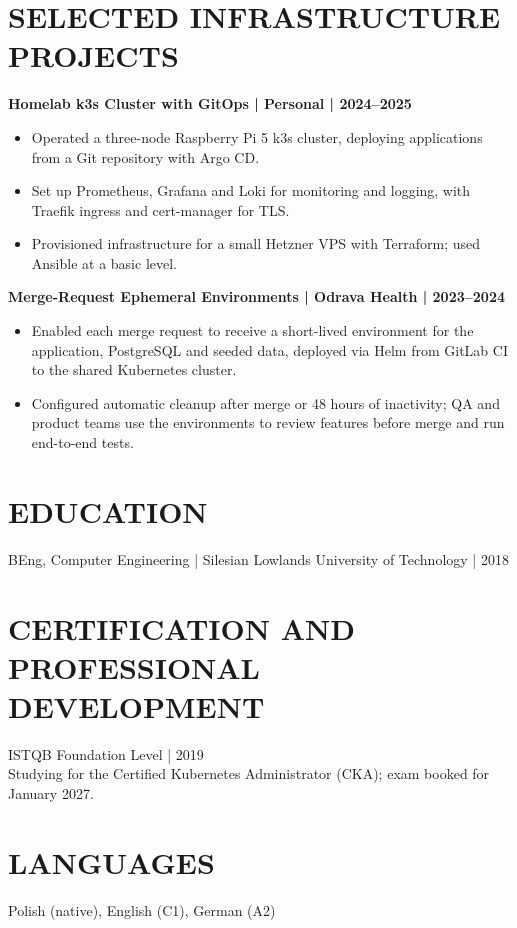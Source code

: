 \documentclass[11pt,a4paper]{article}
\begin{document}
\section*{SELECTED INFRASTRUCTURE PROJECTS}
\textbf{Homelab k3s Cluster with GitOps | Personal | 2024--2025}
\begin{itemize}
\item Operated a three-node Raspberry Pi 5 k3s cluster, deploying applications from a Git repository with Argo CD.
\item Set up Prometheus, Grafana and Loki for monitoring and logging, with Traefik ingress and cert-manager for TLS.
\item Provisioned infrastructure for a small Hetzner VPS with Terraform; used Ansible at a basic level.
\end{itemize}
\textbf{Merge-Request Ephemeral Environments | Odrava Health | 2023--2024}
\begin{itemize}
\item Enabled each merge request to receive a short-lived environment for the application, PostgreSQL and seeded data, deployed via Helm from GitLab CI to the shared Kubernetes cluster.
\item Configured automatic cleanup after merge or 48 hours of inactivity; QA and product teams use the environments to review features before merge and run end-to-end tests.
\end{itemize}

\section*{EDUCATION}
BEng, Computer Engineering | Silesian Lowlands University of Technology | 2018

\section*{CERTIFICATION AND PROFESSIONAL DEVELOPMENT}
ISTQB Foundation Level | 2019\\
Studying for the Certified Kubernetes Administrator (CKA); exam booked for January 2027.

\section*{LANGUAGES}
Polish (native), English (C1), German (A2)
\end{document}
